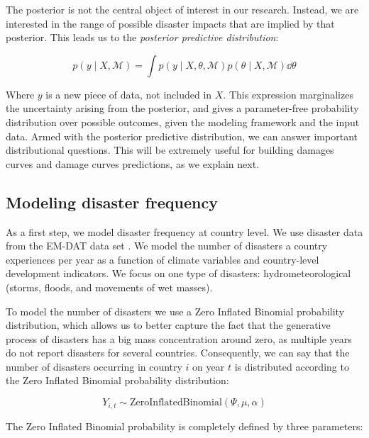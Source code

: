 The posterior is not the central object of interest in our research. Instead, we are interested in the range of possible disaster impacts that are implied by that posterior. This leads us to the \textit{posterior predictive distribution}:

\begin{equation}
p(y \mid X, \mathcal{M}) = \int p(y \mid X, \theta, \mathcal{M}) p(\theta \mid X, \mathcal{M}) \dd\theta
\end{equation}

Where $y$ is a new piece of data, not included in $X$. This expression marginalizes the uncertainty arising from the posterior, and gives a parameter-free probability distribution over possible outcomes, given the modeling framework and the input data. Armed with the posterior predictive distribution, we can answer important distributional questions. This will be extremely useful for building damages curves and damage curves predictions, as we explain next.

\subsection{Modeling disaster frequency}

As a first step, we model disaster frequency at country level. We use disaster data from the EM-DAT data set \citep{cred_emdat_2024}. We model the number of disasters a country experiences per year as a function of climate variables and country-level development indicators. We focus on one type of disasters: hydrometeorological (storms, floods, and movements of wet masses).

To model the number of disasters we use a Zero Inflated Binomial probability distribution, which allows us to better capture the fact that the generative process of disasters has a big mass concentration around zero, as multiple years do not report disasters for several countries. Consequently, we can say that the number of disasters occurring in country $i$ on year $t$ is distributed according to the Zero Inflated Binomial probability distribution:

\begin{equation}
Y_{i,t} \sim \text{ZeroInflatedBinomial}(\Psi, \mu, \alpha)
\end{equation}

The Zero Inflated Binomial probability is completely defined by three parameters:

